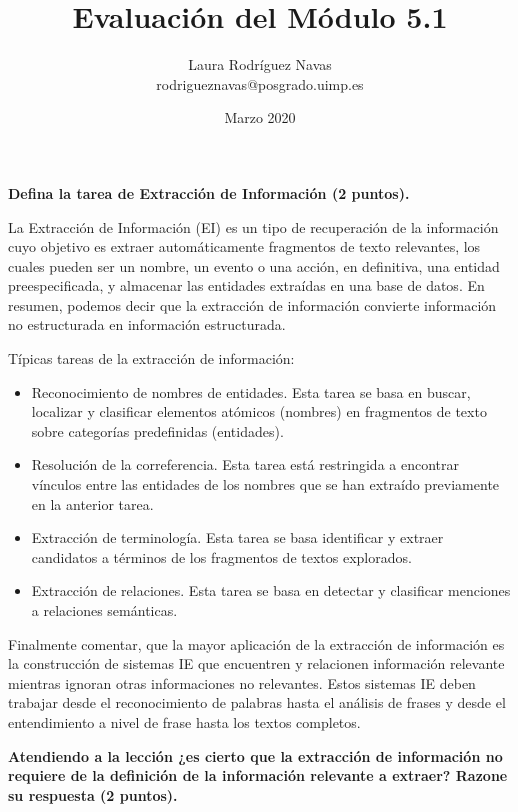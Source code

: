 \documentclass[11pt]{exam}
\title{Evaluación del Módulo 5.1}
\author{Laura Rodríguez Navas \\ rodrigueznavas@posgrado.uimp.es}
\date{Marzo 2020}
\begin{document}
	
\maketitle

\begin{questions}
	
{\bf \question Defina la tarea de Extracción de Información (2 puntos).}

La Extracción de Información (EI) es un tipo de recuperación de la información cuyo objetivo es extraer automáticamente fragmentos de texto relevantes, los cuales pueden ser un nombre, un evento o una acción, en definitiva, una entidad preespecificada, y almacenar las entidades extraídas en una base de datos. En resumen, podemos decir que la extracción de información convierte información no estructurada en información estructurada. 

Típicas tareas de la extracción de información:

\begin{itemize}
	\item Reconocimiento de nombres de entidades. Esta tarea se basa en buscar, localizar y clasificar elementos atómicos (nombres) en fragmentos de texto sobre categorías predefinidas (entidades). 
	\item Resolución de la correferencia. Esta tarea está restringida a encontrar vínculos entre las entidades de los nombres que se han extraído previamente en la anterior tarea.
	\item Extracción de terminología. Esta tarea se basa identificar y extraer candidatos a términos de los fragmentos de textos explorados.
	\item Extracción de relaciones. Esta tarea se basa en detectar y clasificar menciones a relaciones semánticas.
\end{itemize}

Finalmente comentar, que la mayor aplicación de la extracción de información es la construcción de sistemas IE que encuentren y relacionen información relevante mientras ignoran otras informaciones no relevantes. Estos sistemas IE deben trabajar desde el reconocimiento de palabras hasta el análisis de frases y desde el entendimiento a nivel de frase hasta los textos completos.

{\bf \question Atendiendo a la lección ¿es cierto que la extracción de información no requiere de la definición de la información relevante a extraer? Razone su respuesta (2 puntos).}


\end{questions}
\end{document}
